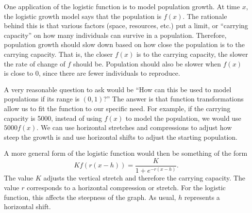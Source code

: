 \documentclass{ximera}
\begin{document}
One application of the logistic function is to model population growth. At time $x$, the logistic growth model says that the population is $f(x)$. The rationale behind this is that various factors (space, resources, etc.) put a limit, or ``carrying capacity'' on how many individuals can survive in a population. Therefore, population growth should slow down based on how close the population is to the carrying capacity. That is, the closer $f(x)$ is to the carrying capacity, the slower the rate of change of $f$ should be. Population should also be slower when $f(x)$ is close to 0, since there are fewer individuals to reproduce. 

A very reasonable question to ask would be ``How can this be used to model populations if its range is $(0, 1)$?'' The answer is that function transformations allow us to fit the function to our specific need. For example, if the carrying capacity is 5000, instead of using $f(x)$ to model the population, we would use $5000f(x)$. We can use horizontal stretches and compressions to adjust how steep the growth is and use horizontal shifts to adjust the starting population. 

A more general form of the logistic function would then be something of the form $$Kf(r(x - h)) = \frac{K}{1 + e^{-r(x - h)}}.$$ The value $K$ adjusts the vertical stretch and therefore the carrying capacity. The value $r$ corresponds to a horizontal compression or stretch. For the logistic function, this affects the steepness of the graph. As usual, $h$ represents a horizontal shift. 
\end{document}
